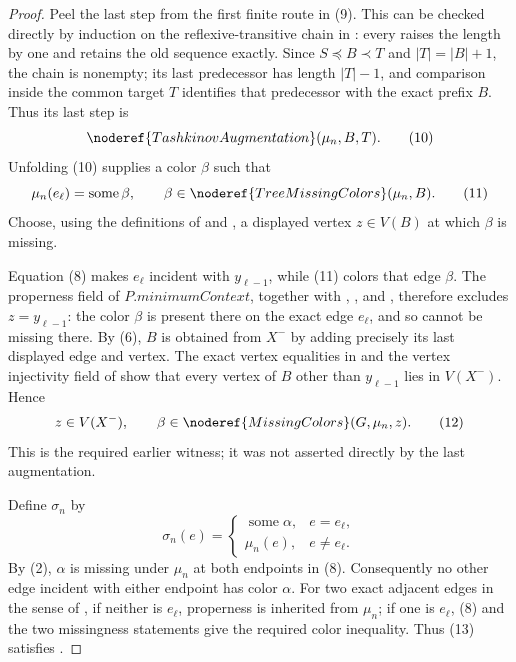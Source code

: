 \begin{proof}
Peel the last step from the first finite route in (9).  This can be checked
directly by induction on the reflexive-transitive chain in
: every
 raises the length by one and retains the
old sequence exactly.  Since \(S\preccurlyeq B\prec T\) and
\(|T|=|B|+1\), the chain is nonempty; its last predecessor has length
\(|T|-1\), and comparison inside the common target \(T\) identifies that
predecessor with the exact prefix \(B\).  Thus its last step is
\[
                     \noderef{TashkinovAugmentation}(\mu_n,B,T). \tag{10}
\]
Unfolding (10) supplies a color \(\beta\) such that
\[
 \mu_n(e_\ell)=\operatorname{some}\beta,
 \qquad \beta\in\noderef{TreeMissingColors}(\mu_n,B).         \tag{11}
\]
Choose, using the definitions of  and
, a displayed vertex \(z\in V(B)\) at which
\(\beta\) is missing.

Equation (8) makes \(e_\ell\) incident with \(y_{\ell-1}\), while (11)
colors that edge \(\beta\).  The properness field of
\(P.\mathit{minimumContext}\), together with
, , and
, therefore excludes
\(z=y_{\ell-1}\): the color \(\beta\) is present there on the exact edge
\(e_\ell\), and so cannot be missing there.  By (6), \(B\) is obtained
from \(X^-\) by adding precisely its last displayed edge and vertex.
The exact vertex equalities in  and
the vertex injectivity field of  show that every
vertex of \(B\) other than \(y_{\ell-1}\) lies in \(V(X^-)\).  Hence
\[
             z\in V(X^-),\qquad
             \beta\in\noderef{MissingColors}(G,\mu_n,z).      \tag{12}
\]
This is the required earlier witness; it was not asserted directly by the
last augmentation.

Define \(\sigma_n\) by
\[
 \sigma_n(e)=
 \begin{cases}
   \operatorname{some}\alpha,&e=e_\ell,\\
   \mu_n(e),&e\ne e_\ell.
 \end{cases}                                                  \tag{13}
\]
By (2), \(\alpha\) is missing under \(\mu_n\) at both endpoints in
(8).  Consequently no other edge incident with either endpoint has color
\(\alpha\).  For two exact adjacent edges in the sense of
, if neither is \(e_\ell\), properness is inherited
from \(\mu_n\); if one is \(e_\ell\), (8) and the two missingness statements
give the required color inequality.  Thus (13) satisfies
.


\end{proof}
